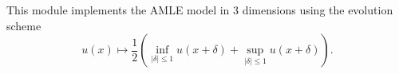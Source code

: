 This module implements the AMLE model in 3 dimensions using the evolution
scheme
$$u(x) \mapsto \frac12 \left( \inf_{|\delta|\leq 1} u(x+\delta)  
+ \sup_{|\delta|\leq 1} u(x+\delta)  \right).$$
